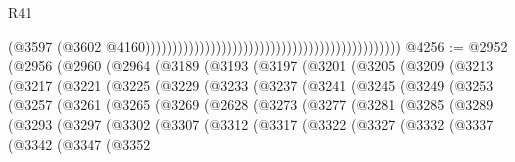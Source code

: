 \begin{lexlean}{R41}
\begin{coremodule}
                                                                                              (@3597
                                                                                                (@3602
                                                                                                  @4160)))))))))))))))))))))))))))))))))))))))))))))))
@4256 := @2952
    (@2956
      (@2960
        (@2964
          (@3189
            (@3193
              (@3197
                (@3201
                  (@3205
                    (@3209
                      (@3213
                        (@3217
                          (@3221
                            (@3225
                              (@3229
                                (@3233
                                  (@3237
                                    (@3241
                                      (@3245
                                        (@3249
                                          (@3253
                                            (@3257
                                              (@3261
                                                (@3265
                                                  (@3269
                                                    (@2628
                                                      (@3273
                                                        (@3277
                                                          (@3281
                                                            (@3285
                                                              (@3289
                                                                (@3293
                                                                  (@3297
                                                                    (@3302
                                                                      (@3307
                                                                        (@3312
                                                                          (@3317
                                                                            (@3322
                                                                              (@3327
                                                                                (@3332
                                                                                  (@3337
                                                                                    (@3342
                                                                                      (@3347
                                                                                        (@3352

\end{coremodule}
\end{lexlean}
